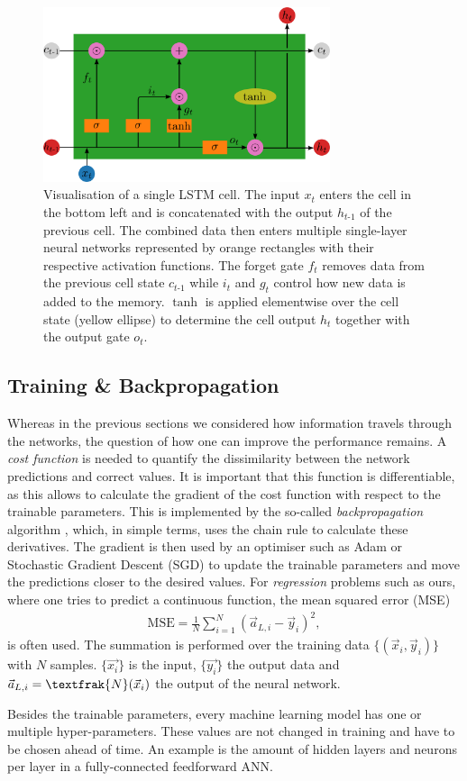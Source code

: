 \begin{figure}[h]
	\centering
	\includegraphics[width=0.75\textwidth]{img/lstm}
	\caption{Visualisation of a single LSTM cell. The input $x_t$ enters the cell in the bottom left and is concatenated with the output $h_{t\text{-}1}$ of the previous cell. The combined data then enters multiple single-layer neural networks represented by orange rectangles with their respective activation functions. The forget gate $f_t$ removes data from the previous cell state $c_{t\text{-}1}$ while $i_t$ and $g_t$ control how new data is added to the memory. $\tanh$ is applied elementwise over the cell state (yellow ellipse) to determine the cell output $h_t$ together with the output gate $o_t$.}
	\label{lstm}
\end{figure}

\newpage

\subsection{Training \& Backpropagation} \label{trainbackprop}
Whereas in the previous sections we considered how information travels through the networks, the question of how one can improve the performance remains.
A \textit{cost function} is needed to quantify the dissimilarity between the network predictions and correct values.
It is important that this function is differentiable, as this allows to calculate the gradient of the cost function with respect to the trainable parameters.
This is implemented by the so-called \textit{backpropagation} algorithm \cite{rumelhart1986learning, nielsenneural}, which, in simple terms, uses the chain rule to calculate these derivatives.
The gradient is then used by an optimiser such as Adam \cite{kingma2017adam} or Stochastic Gradient Descent (SGD) to update the trainable parameters and move the predictions closer to the desired values.
For \textit{regression} problems such as ours, where one tries to predict a continuous function, the mean squared error (MSE)
\begin{align*}
\mathrm{MSE} = \frac{1}{N} \sum_{i=1}^N (\vec{a}_{L, i} - \vec{y}_i)^2,
\end{align*}
is often used.
The summation is performed over the training data $\{(\vec{x}_i, \vec{y}_i)\}$ with $N$ samples.
$\{\vec{x_i}\}$ is the input, $\{\vec{y_i}\}$ the output data and $\vec{a}_{L, i} = \textfrak{N}(\vec{x}_i)$ the output of the neural network.

Besides the trainable parameters, every machine learning model has one or multiple hyper-parameters.
These values are not changed in training and have to be chosen ahead of time.
An example is the amount of hidden layers and neurons per layer in a fully-connected feedforward ANN.
